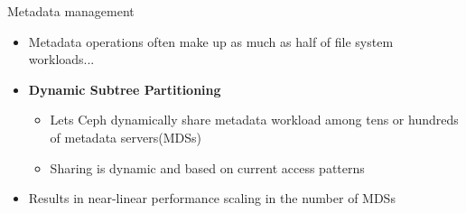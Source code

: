 
\begin{frame}{Metadata management}
    \begin{itemize}
        \item Metadata operations often make up as much as half of file system workloads...
        \item \textbf{Dynamic Subtree Partitioning}
            \begin{itemize}
                \item Lets Ceph dynamically share metadata workload among tens or hundreds of metadata servers(MDSs)
                \item Sharing is dynamic and based on current access patterns
            \end{itemize}
        \item Results in near-linear performance scaling in the number of MDSs
    \end{itemize}
\end{frame}

%

